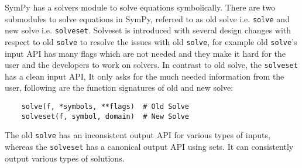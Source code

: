 
SymPy has a solvers module to solve equations symbolically. There are two
submodules to solve equations in SymPy, referred to as old solve i.e.
\texttt{solve} and new solve i.e. \texttt{solveset}. Solveset is introduced
with several design changes with respect to old \texttt{solve} to resolve the
issues with old \texttt{solve}, for example old \texttt{solve}'s input API has
many flags which are not needed and they make it hard for the user and the
developers to work on solvers. In contrast to old solve, the \texttt{solveset}
has a clean input API, It only asks for the much needed information from the
user, following are the function signatures of old and new solve:

\begin{verbatim}
    solve(f, *symbols, **flags)  # Old Solve
    solveset(f, symbol, domain)  # New Solve
\end{verbatim}

The old \texttt{solve} has an inconsistent output API for various types of
inputs, whereas the \texttt{solveset} has a canonical output API using sets.
It can consistently output various types of solutions.
